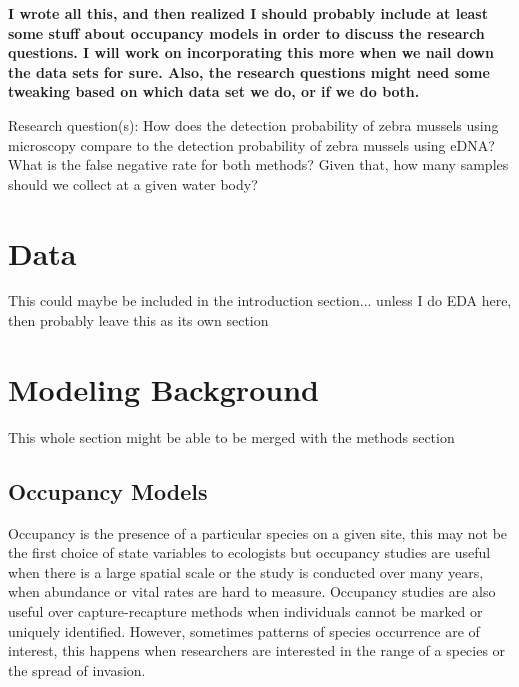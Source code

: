 \documentclass[12pt]{article}\usepackage[]{graphicx}\usepackage[]{color}
\begin{document}
\textbf{I wrote all this, and then realized I should probably include at least some stuff about occupancy models in order to discuss the research questions. I will work on incorporating this more when we nail down the data sets for sure. Also, the research questions might need some tweaking based on which data set we do, or if we do both.} 

Research question(s): How does the detection probability of zebra mussels using microscopy compare to the detection probability of zebra mussels using eDNA? What is the false negative rate for both methods? Given that, how many samples should we collect at a given water body? 


\section{Data}

This could maybe be included in the introduction section... unless I do EDA here, then probably leave this as its own section



\section{Modeling Background}

This whole section might be able to be merged with the methods section 

\subsection{Occupancy Models}



Occupancy is the presence of a particular species on a given site, this may not be the first choice of state variables to ecologists but occupancy studies are useful when there is a large spatial scale or the study is conducted over many years, when abundance or vital rates are hard to measure. Occupancy studies are also useful over capture-recapture methods when individuals cannot be marked or uniquely identified. However, sometimes patterns of species occurrence are of interest, this happens when researchers are interested in the range of a species or the spread of invasion. 
\end{document}
